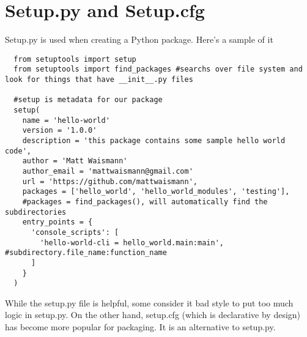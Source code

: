 \documentclass{article}%
\begin{document}
\section{Setup.py and Setup.cfg}
Setup.py is used when creating a Python package. Here's a sample of it
\begin{lstlisting}
  from setuptools import setup
  from setuptools import find_packages #searchs over file system and look for things that have __init__.py files 

  #setup is metadata for our package
  setup(
    name = 'hello-world'
    version = '1.0.0'
    description = 'this package contains some sample hello world code',
    author = 'Matt Waismann'
    author_email = 'mattwaismann@gmail.com'
    url = 'https://github.com/mattwaismann',
    packages = ['hello_world', 'hello_world_modules', 'testing'],
    #packages = find_packages(), will automatically find the subdirectories
    entry_points = {
      'console_scripts': [
        'hello-world-cli = hello_world.main:main', #subdirectory.file_name:function_name
      ]
    }
  )
\end{lstlisting}
While the setup.py file is helpful, some consider it bad style to put too much logic in setup.py. On the other hand,
setup.cfg (which is declarative by design) has become more popular for packaging. It is an alternative to setup.py.
\end{document}
